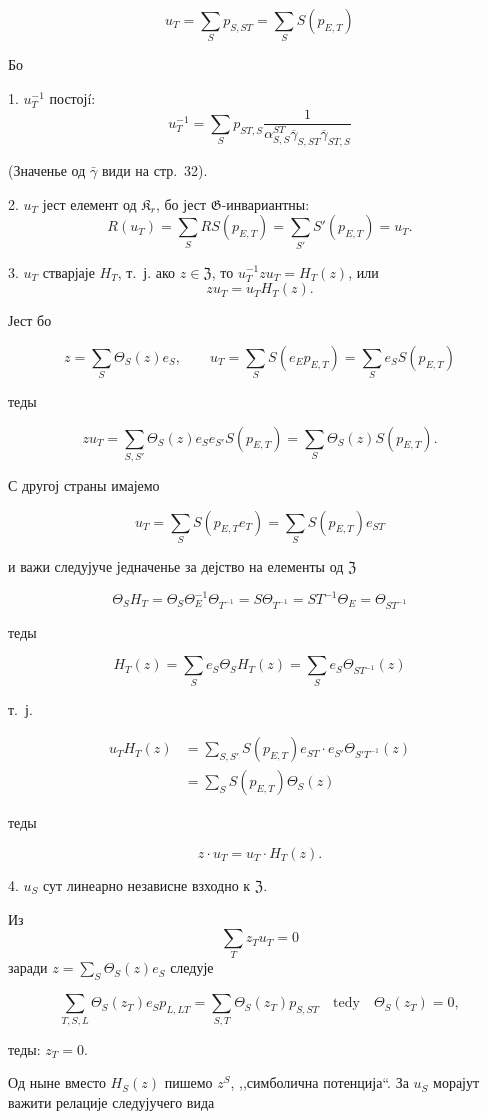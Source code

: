 \documentclass[11pt]{article}
\begin{document}
\[
u_T=\sum_S p_{S,ST}=\sum_S S(p_{E,T})
\]

Бо

1. \(u_T^{-1}\) постојí:
\[
u_T^{-1}=\sum_S p_{ST,S}
\frac{1}{\alpha_{S,S}^{ST}\overline{\gamma}_{S,ST}\overline{\gamma}_{ST,S}}
\]

(Значенье од \(\bar{\gamma}\) види на стр.~32).

2. \(u_T\) јест елемент од \(\mathfrak K_r\), бо јест \(\mathfrak G\)-инвариантны:
\[
R(u_T)=\sum_S RS(p_{E,T})=\sum_{S'} S'(p_{E,T})=u_T.
\]

3. \(u_T\) стварјаје \(H_T\), т.~ј. ако \(z\in\mathfrak Z\), то \(u_T^{-1}zu_T=H_T(z)\), или
\[
z u_T=u_T H_T(z).
\]

Јест бо

\[
z=\sum_S\Theta_S(z)e_S,\qquad
u_T=\sum_S S(e_Ep_{E,T})=\sum_S e_S S(p_{E,T})
\]

теды

\[
zu_T=\sum_{S,S'}\Theta_S(z)e_Se_{S'}S(p_{E,T})
=\sum_S\Theta_S(z)S(p_{E,T}).
\]

С другој страны имајемо

\[
u_T=\sum_S S(p_{E,T}e_T)=\sum_S S(p_{E,T})e_{ST}
\]

и важи следујуче једначенье за дејство на елементы од \(\mathfrak Z\)

\[
\Theta_S H_T=\Theta_S\Theta_E^{-1}\Theta_{T^{-1}}
=S\Theta_{T^{-1}}=ST^{-1}\Theta_E=\Theta_{ST^{-1}}
\]

теды

\[
H_T(z)=\sum_S e_S\Theta_S H_T(z)=\sum_S e_S\Theta_{ST^{-1}}(z)
\]

т.~ј.

\[
\begin{aligned}
u_TH_T(z)
&=\sum_{S,S'} S(p_{E,T})e_{ST}\cdot e_{S'}\Theta_{S'T^{-1}}(z)\\
&=\sum_S S(p_{E,T})\Theta_S(z)
\end{aligned}
\]

теды

\[
z\cdot u_T=u_T\cdot H_T(z).
\]

4. \(u_S\) сут линеарно независне взходно к \(\mathfrak Z\).

Из
\[
\sum_T z_Tu_T=0
\]
заради \(z=\sum_S\Theta_S(z)e_S\) следује

\[
\sum_{T,S,L}\Theta_S(z_T)e_Sp_{L,LT}
=\sum_{S,T}\Theta_S(z_T)p_{S,ST}\quad\text{tedy}\quad
\Theta_S(z_T)=0,
\]

теды: \(z_T=0\).

Од ныне вместо \(H_S(z)\) пишемо \(z^S\), ,,симболична потенција``. За \(u_S\) морајут важити релације следујучего вида
\end{document}

